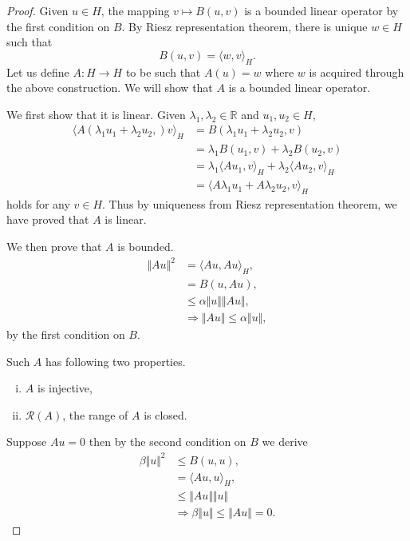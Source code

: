 \documentclass{article}
\numberwithin{equation}{section}
\begin{document}
\begin{proof}
Given $u\in H$, the mapping $v\mapsto B(u,v)$ is a bounded linear operator by the first condition on $B$. By Riesz representation theorem, there is unique $w\in H$ such that 
\begin{equation*}
B(u,v) = \langle w,v\rangle_H.
\end{equation*}
Let us define $A:H\to H$ to be such that $A(u) = w$ where $w$ is acquired through the above construction. We will show that $A$ is a bounded linear operator.\\
\par We first show that it is linear. Given $\lambda_1,\lambda_2\in \mathbb{R}$ and $u_1,u_2\in H$,
\begin{align*}
\langle A(\lambda_1u_1+\lambda_2u_2,)v\rangle_H & = B(\lambda_1u_1+\lambda_2u_2,v)\\
& = \lambda_1B(u_1,v)+\lambda_2B(u_2,v)\\
& = \lambda_1\langle Au_1,v\rangle_H+\lambda_2\langle Au_2,v\rangle_H\\
& = \langle A\lambda_1u_1+A\lambda_2u_2,v\rangle_H
\end{align*}
holds for any $v\in H$. Thus by uniqueness from Riesz representation theorem, we have proved that $A$ is linear.\\
\par We then prove that $A$ is bounded.
\begin{align*}
\Vert Au\Vert^2& = \langle Au,Au\rangle_H,\\
& = B(u,Au),\\
& \leq \alpha\Vert u\Vert\Vert Au\Vert,\\
&\Rightarrow \Vert Au\Vert\leq \alpha\Vert u\Vert,
\end{align*}
by the first condition on $B$.\\
\par Such $A$ has following two properties.
\begin{enumerate}[i).]
\item $A$ is injective,
\item $\mathcal{R}(A)$, the range of $A$ is closed.
\end{enumerate}

Suppose $Au=0$ then by the second condition on $B$ we derive
\begin{align*}
\beta\Vert u\Vert^2 &\leq B(u,u),\\
& = \langle Au,u\rangle_H,\\
& \leq \Vert Au\Vert\Vert u\Vert\\
&\Rightarrow \beta\Vert u\Vert\leq\Vert Au\Vert = 0.
\end{align*}


\end{proof}
\end{document}
